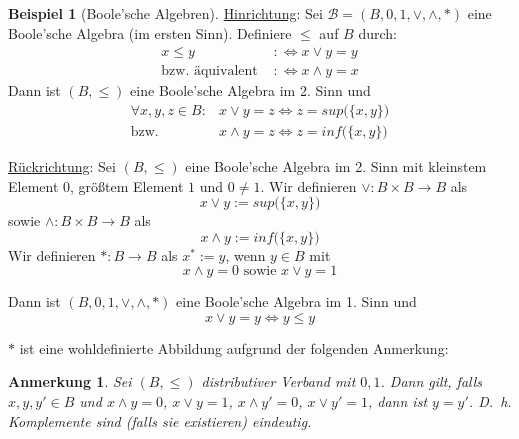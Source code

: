 \documentclass{article}
\theoremstyle{definition}
\newtheorem*{bsp}{Beispiel}
\theoremstyle{plain}
\newtheorem*{anm}{Anmerkung}
\newcommand{\m}[1]{\mathcal{#1}}
\begin{document}
\begin{bsp}[Boole'sche Algebren]
        \underline{Hinrichtung}: Sei $ \m{B} = (B, 0, 1, \lor, \land, * ) $ eine Boole'sche Algebra (im ersten Sinn).
        Definiere $ \leq $ auf $ B $ durch:
        \begin{align*}
            x \leq y & :\Leftrightarrow x \lor y = y \\
            \text{bzw. äquivalent } & :\Leftrightarrow x \land y = x
        \end{align*}
        Dann ist $ (B, \leq) $ eine Boole'sche Algebra im 2. Sinn und
        \begin{align*}
            \forall x, y, z \in B: & x \lor y = z \Leftrightarrow z = sup \big(\{x, y\}\big) \\
            \text{bzw. } & x \land y = z \Leftrightarrow z = inf \big(\{x, y\}\big)
        \end{align*}

        \underline{Rückrichtung}: Sei $ (B, \leq) $ eine Boole'sche Algebra im 2. Sinn mit kleinstem Element $ 0 $, größtem Element $ 1 $ und $ 0 \not = 1 $.
        Wir definieren $ \lor : B \times B \rightarrow B $ als
        \begin{equation*}
            x \lor y := sup\big(\{x, y\}\big)
        \end{equation*}
        sowie $ \land : B \times B \rightarrow B $ als
        \begin{equation*}
            x \land y := inf\big(\{x, y\}\big)
        \end{equation*}
        Wir definieren $ * : B \rightarrow B $ als $ x^* := y $, wenn $ y \in B $ mit
        \begin{equation*}
            x \land y = 0 \text{ sowie } x \lor y = 1
        \end{equation*}

        Dann ist $ (B, 0, 1, \lor, \land, *) $ eine Boole'sche Algebra im 1. Sinn und
        \begin{equation*}
            x \lor y = y \Leftrightarrow y \leq y
        \end{equation*}

        $ * $ ist eine wohldefinierte Abbildung aufgrund der folgenden Anmerkung:
        \begin{anm}
            Sei $ (B, \leq) $ distributiver Verband mit $ 0, 1 $.
            Dann gilt, falls $ x, y, y' \in B $ und $ x \land y = 0 $, $ x \lor y = 1 $, $ x \land y' = 0 $, $ x \lor y' = 1 $, dann ist $ y = y' $.
            D.~h. Komplemente sind (falls sie existieren) eindeutig.
        \end{anm}


\end{bsp}
\end{document}
